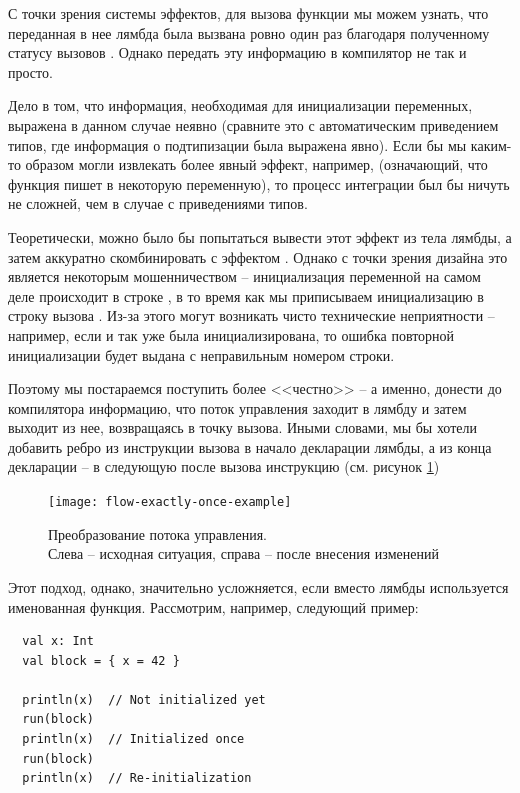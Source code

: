 С точки зрения системы эффектов, для вызова функции  мы можем узнать, что переданная в нее лямбда была вызвана ровно один раз благодаря полученному статусу вызовов . Однако передать эту информацию в компилятор не так и просто.

Дело в том, что информация, необходимая для инициализации переменных, выражена в данном случае неявно (сравните это с автоматическим приведением типов, где информация о подтипизации была выражена явно). Если бы мы каким-то образом могли извлекать более явный эффект, например,  (означающий, что функция пишет в некоторую переменную), то процесс интеграции был бы ничуть не сложней, чем в случае с приведениями типов.

Теоретически, можно было бы попытаться вывести этот эффект из тела лямбды, а затем аккуратно скомбинировать с эффектом . Однако с точки зрения дизайна это является некоторым мошенничеством -- инициализация переменной на самом деле происходит в строке , в то время как мы приписываем инициализацию в строку вызова . Из-за этого могут возникать чисто технические неприятности -- например, если  и так уже была инициализирована, то ошибка повторной инициализации будет выдана с неправильным номером строки.

Поэтому мы постараемся поступить более <<честно>> -- а именно, донести до компилятора информацию, что поток управления заходит в лямбду и затем выходит из нее, возвращаясь в точку вызова. Иными словами, мы бы хотели добавить ребро из инструкции вызова в начало декларации лямбды, а из конца декларации -- в следующую после вызова инструкцию (см. рисунок \ref{fig:flow-exactly-once-example})

\begin{figure}[h]
  \texttt{[image: flow-exactly-once-example]}

  \caption{Преобразование потока управления. \\ Слева -- исходная ситуация, справа -- после внесения изменений}
  \label{fig:flow-exactly-once-example}
\end{figure}

Этот подход, однако, значительно усложняется, если вместо лямбды используется именованная функция. Рассмотрим, например, следующий пример:

\begin{verbatim}
  val x: Int
  val block = { x = 42 }

  println(x)  // Not initialized yet
  run(block)
  println(x)  // Initialized once
  run(block)
  println(x)  // Re-initialization
\end{verbatim}

